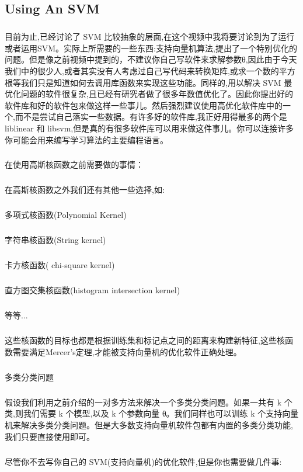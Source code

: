 \documentclass{article}
\begin{document}
\begin{CJK}{UTF8}{gbsn}
\subsection{Using An SVM}
\subparagraph{}
目前为止,已经讨论了 SVM 比较抽象的层面,在这个视频中我将要讨论到为了运行或者运用SVM。实际上所需要的一些东西:支持向量机算法,提出了一个特别优化的问题。但是像之前视频中提到的，不建议你自己写软件来求解参数θ,因此由于今天我们中的很少人,或者其实没有人考虑过自己写代码来转换矩阵,或求一个数的平方根等我们只是知道如何去调用库函数来实现这些功能。同样的,用以解决 SVM 最优化问题的软件很复杂,且已经有研究者做了很多年数值优化了。因此你提出好的软件库和好的软件包来做这样一些事儿。然后强烈建议使用高优化软件库中的一个,而不是尝试自己落实一些数据。有许多好的软件库,我正好用得最多的两个是 liblinear 和 libsvm,但是真的有很多软件库可以用来做这件事儿。你可以连接许多你可能会用来编写学习算法的主要编程语言。
\begin{figure}[H]
\label{fig:748}
\end{figure}
\subparagraph{}
在使用高斯核函数之前需要做的事情：
\begin{figure}[H]
\label{fig:749}
\end{figure}
\subparagraph{}
在高斯核函数之外我们还有其他一些选择,如:
\subparagraph{}
多项式核函数(Polynomial Kernel)
\subparagraph{}
字符串核函数(String kernel)
\subparagraph{}
卡方核函数( chi-square kernel)
\subparagraph{}
直方图交集核函数(histogram intersection kernel)
\subparagraph{}
等等...
\subparagraph{}
这些核函数的目标也都是根据训练集和标记点之间的距离来构建新特征,这些核函数需要满足Mercer's定理,才能被支持向量机的优化软件正确处理。
\begin{figure}[H]
\label{fig:750}
\end{figure}
\begin{figure}[H]
\label{fig:751}
\end{figure}
\subparagraph{}
多类分类问题
\begin{figure}[H]
\label{fig:752}
\end{figure}
\subparagraph{}
假设我们利用之前介绍的一对多方法来解决一个多类分类问题。如果一共有 k 个类,则我们需要 k 个模型,以及 k 个参数向量 θ。我们同样也可以训练 k 个支持向量机来解决多类分类问题。但是大多数支持向量机软件包都有内置的多类分类功能,我们只要直接使用即可。
\subparagraph{}
尽管你不去写你自己的 SVM(支持向量机)的优化软件,但是你也需要做几件事:

\end{CJK}
\end{document}
